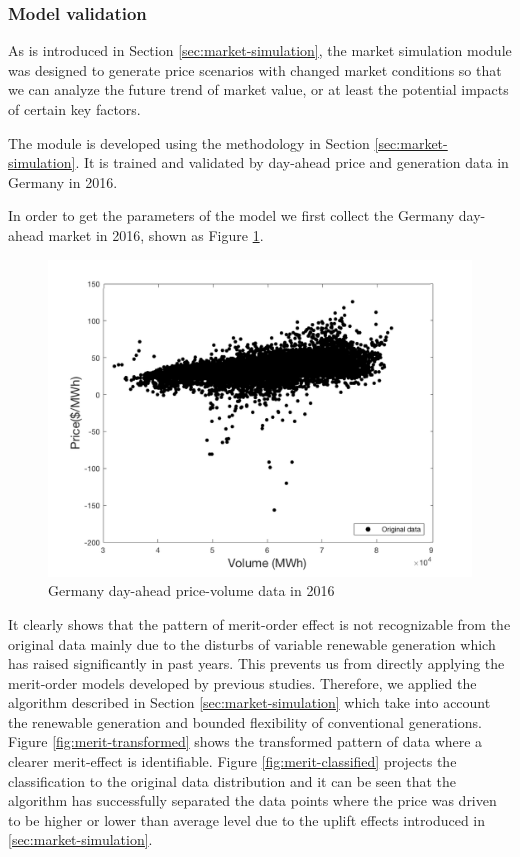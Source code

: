 \subsubsection{Model validation}
As is introduced in Section \ref{sec:market-simulation}, the market simulation module was designed to generate price scenarios with changed market conditions so that we can analyze the future trend of market value, or at least the potential impacts of certain key factors. 

The module is developed using the methodology in Section \ref{sec:market-simulation}. It is trained and validated by day-ahead price and generation data in Germany in 2016. 

In order to get the parameters of the model we first collect the Germany day-ahead market in 2016, shown as Figure \ref{fig:merit-orignal}.

\begin{figure}[h!]
	\centering
	\includegraphics[width=0.95\linewidth]{Figures/Merit-order-original}
	\caption{Germany day-ahead price-volume data in 2016}
	\label{fig:merit-orignal}
\end{figure}

It clearly shows that the pattern of merit-order effect is not recognizable from the original data mainly due to the disturbs of variable renewable generation which has raised significantly in past years. This prevents us from directly applying the merit-order models developed by previous studies\cite{He2013}\cite{Grunewald2012a}. Therefore, we applied the algorithm described in Section \ref{sec:market-simulation} which take into account the renewable generation and bounded flexibility of conventional generations. Figure \ref{fig:merit-transformed} shows the transformed pattern of data where a clearer merit-effect is identifiable. Figure \ref{fig:merit-classified} projects the classification to the original data distribution and it can be seen that the algorithm has successfully separated the data points where the price was driven to be higher or lower than average level due to the uplift effects introduced in \ref{sec:market-simulation}. 

